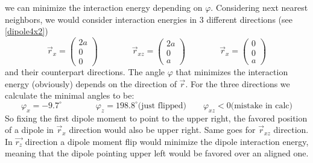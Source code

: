 	we can minimize the interaction energy depending on $\varphi$. Considering next nearest neighbors, we would consider interaction energies in 3 different directions (see \autoref{dipole4x2})
	\begin{equation}
		\vec{r}_x =	\left(\begin{array}{c}
			2 a \\
			0 \\
			0
		\end{array} \right)\qquad  	\qquad
		\vec{r}_{xz} =	\left( \begin{array}{c}
			2 a \\
			0 \\
			a
		\end{array} \right) \qquad 		\qquad
		\vec{r}_x =	\left(\begin{array}{c}
			0 \\
			0 \\
			a
		\end{array} \right)
	\end{equation}
	and their counterpart directions. The angle $\varphi$ that minimizes the interaction energy (obviously) depends on the direction of $\vec{r}$. For the three directions we calculate the minimal angles to be:
	\begin{equation}
		\varphi_x =	-9.7^\circ \qquad \qquad \varphi_z = 198.8^\circ \text{(just flipped)} \qquad \varphi_{xz} < 0 \text{(mistake in calc)}
	\end{equation}
	So fixing the first dipole moment to point to the upper right, the favored position of a dipole in $\vec{r}_x$ direction would also be upper right. Same goes for $\vec{r}_{xz}$ direction. In $\vec{r_z}$ direction a dipole moment flip would minimize the dipole interaction energy, meaning that the dipole pointing upper left would be favored over an aligned one.
